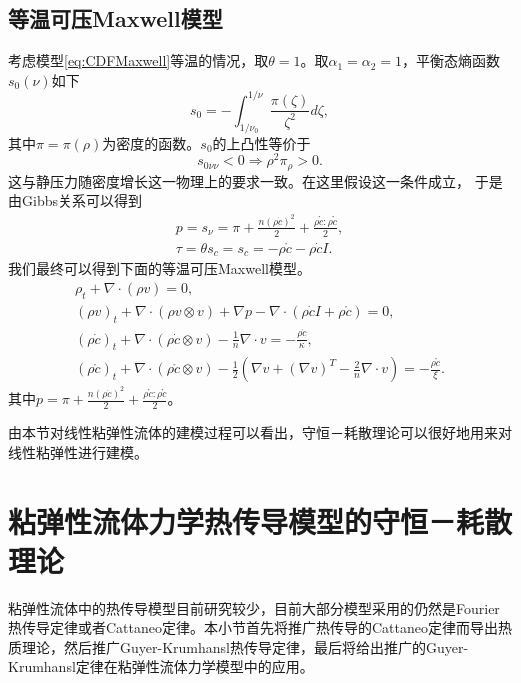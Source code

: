 	\subsection{等温可压Maxwell模型}
	考虑模型\eqref{eq:CDFMaxwell}等温的情况，取$\theta=1$。取$\alpha_1=\alpha_2=1$，平衡态熵函数$s_0(\nu)$如下
	\begin{equation*}
		s_0 = - \int_{1/\nu_0}^{1/\nu} \frac{\pi(\zeta)}{\zeta^2} d\zeta,
	\end{equation*}
	其中$\pi=\pi(\rho)$为密度的函数。$s_0$的上凸性等价于
	\begin{equation*}
		s_{0\nu \nu} < 0 \Rightarrow \rho^2 \pi_\rho >0.
	\end{equation*}
	这与静压力随密度增长这一物理上的要求一致。在这里假设这一条件成立，
	于是由Gibbs关系可以得到
	\begin{eqnarray*}
		p = s_{\nu}= \pi + \frac{n(\rho \dot{c})^2}{2} + \frac{\rho \mathring{c}:\rho \mathring{c}}{2}, \\
		\tau = \theta s_c = s_c = - \rho \mathring{c} - \rho \dot{c} I.
	\end{eqnarray*}
	我们最终可以得到下面的等温可压Maxwell模型。
	\begin{subequations}\label{eq:CDFalphaConst}
		\begin{align}
			\rho_t + \nabla \cdot (\rho v) = 0, \\
			(\rho v)_t + \nabla \cdot (\rho v \otimes v) + \nabla p - \nabla \cdot ( \rho \dot{c} I +  \rho \mathring{c}) = 0, \\
			(\rho \dot{c})_t  + \nabla \cdot(\rho \dot{c} \otimes v) -  \frac{1}{n} \nabla \cdot v = - \frac{\rho \dot{c}}{\kappa}, \\
			(\rho \mathring{c})_t + \nabla \cdot (\rho \mathring{c} \otimes v) - \frac{1}{2} (\nabla v + (\nabla v)^T - \frac{2}{n} \nabla \cdot v) = - \frac{\rho \mathring{c}}{\xi}.
		\end{align}
	\end{subequations}
	其中$p = \pi + \frac{n(\rho \dot{c})^2}{2} + \frac{\rho \mathring{c}:\rho \mathring{c}}{2}$。

	由本节对线性粘弹性流体的建模过程可以看出，守恒－耗散理论可以很好地用来对线性粘弹性进行建模。

	\section{粘弹性流体力学热传导模型的守恒－耗散理论}
	粘弹性流体中的热传导模型目前研究较少，目前大部分模型采用的仍然是Fourier热传导定律或者Cattaneo定律。本小节首先将推广热传导的Cattaneo定律而导出热质理论，然后推广Guyer-Krumhansl热传导定律，最后将给出推广的Guyer-Krumhansl定律在粘弹性流体力学模型中的应用。

